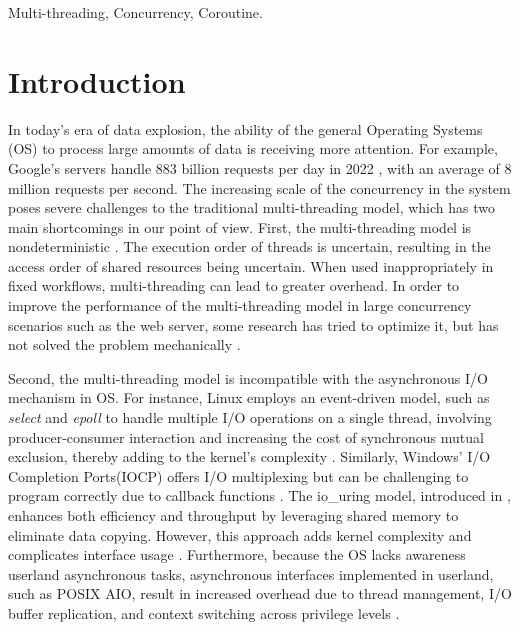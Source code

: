 \documentclass[conference]{IEEEtran}
\begin{document}
\begin{IEEEkeywords}
Multi-threading, Concurrency, Coroutine.
\end{IEEEkeywords}

\section{Introduction}
\label{section: introduction}

In today's era of data explosion, the ability of the general Operating Systems (OS) to process large amounts of data is receiving more attention. For example, Google's servers handle 883 billion requests per day in 2022 \cite{google-search-statistics}, with an average of 8 million requests per second. The increasing scale of the concurrency in the system poses severe challenges to the traditional multi-threading model, which has two main shortcomings in our point of view. First, the multi-threading model is nondeterministic \cite{Lee:EECS-2006-1}. The execution order of threads is uncertain, resulting in the access order of shared resources being uncertain. When used inappropriately in fixed workflows, multi-threading can lead to greater overhead. In order to improve the performance of the multi-threading model in large concurrency scenarios such as the web server, some research has tried to optimize it, but has not solved the problem mechanically \cite{li_combining_2007, howell_cooperative_2002}.

Second, the multi-threading model is incompatible with the asynchronous I/O mechanism in OS. For instance, Linux employs an event-driven model, such as \textit{select} and \textit{epoll} to handle multiple I/O operations on a single thread, involving producer-consumer interaction and increasing the cost of synchronous mutual exclusion, thereby adding to the kernel's complexity \cite{Gammo2004ComparingAE}. Similarly, Windows' I/O Completion Ports(IOCP) \cite{alvinashcraft_io_2022} offers I/O multiplexing but can be challenging to program correctly due to callback functions \cite{callbackhell}. The io\_uring model, introduced in \cite{io_uring}, enhances both efficiency and throughput by leveraging shared memory to eliminate data copying. However, this approach adds kernel complexity and complicates interface usage \cite{li2021pm}. Furthermore, because the OS lacks awareness userland asynchronous tasks, asynchronous interfaces implemented in userland, such as POSIX AIO, result in increased overhead due to thread management, I/O buffer replication, and context switching across privilege levels \cite{jones2006boost}.
\end{document}
